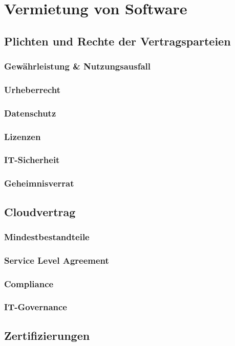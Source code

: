 \chapter{Vermietung von Software}
\section{Plichten und Rechte der Vertragsparteien}
  \subsection{Gew\"ahrleistung \& Nutzungsausfall}
 \subsection{Urheberrecht}
    \subsection{Datenschutz}
    \subsection{Lizenzen}
 \subsection{IT-Sicherheit}
 \subsection{Geheimnisverrat}
\section{Cloudvertrag}
\subsection{Mindestbestandteile}
\subsection{Service Level Agreement}
\subsection{Compliance}
\subsection{IT-Governance}
\section{Zertifizierungen}


  